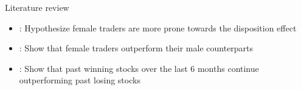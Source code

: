 \documentclass{beamer}
\begin{document}
\begin{frame}{Literature review}

	\begin{itemize}
	    \item \cite{Shefrin1985}: Hypothesize female traders are more prone towards the disposition effect
		\item \cite{Lu2017}: Show that female traders outperform their male counterparts
		\item \cite{JEGADEESH1993}: Show that past winning stocks over the last 6 months continue outperforming past losing stocks


	\end{itemize}

\end{frame}
\end{document}
